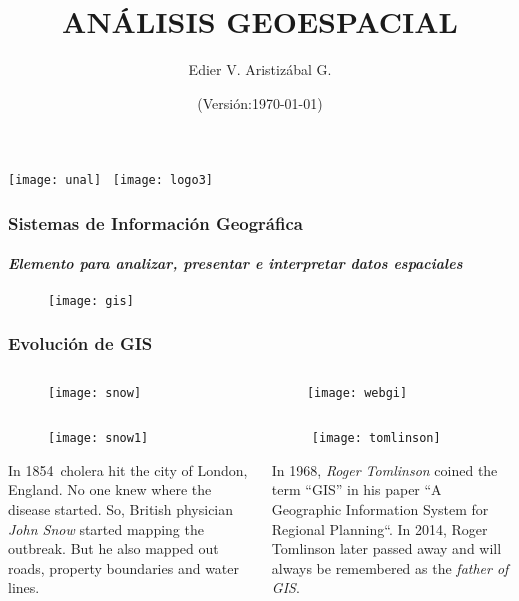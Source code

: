 \documentclass[14pt]{beamer}
\title[GIS - Intro]{ANÁLISIS GEOESPACIAL}
\author[Edier Aristizábal]{Edier V. Aristizábal G.}
\institute{\emph{evaristizabalg@unal.edu.co}}
\date{\tiny{(Versión:\today)}}
\begin{document}
\begin{frame}
\titlepage
\centering
	\texttt{[image: unal]}\hspace*{4.75cm}~%
   	\texttt{[image: logo3]}
\end{frame}
\begin{frame}
\frametitle{Sistemas de Información Geográfica}
\framesubtitle{\emph {Elemento para analizar, presentar e interpretar datos espaciales}}
  \begin{figure}
    \centering
    \texttt{[image: gis]}
  \end{figure}
\end{frame}
\begin{frame}\frametitle{Evolución de GIS}
\begin{columns}
		\begin{column}{.48\linewidth}
			\begin{figure}
				\texttt{[image: snow]}\\
			\end{figure}
		\end{column}
		\begin{column}{.48\linewidth}
			\begin{figure}
				\texttt{[image: webgi]}\\
			\end{figure}
		\end{column}
	\end{columns}
	\begin{columns}
		\begin{column}{.48\linewidth}
			\begin{figure}
				\texttt{[image: snow1]}\\
			\end{figure}
\scriptsize{In 1854\, cholera hit the city of London, England. No one knew where the disease started. So, British physician \emph{John Snow} started mapping the outbreak. But he also mapped out roads, property boundaries and water lines.}
		\end{column}
		\begin{column}{.48\linewidth}
			\begin{figure}
				\texttt{[image: tomlinson]}\\
			\end{figure}
\scriptsize{In 1968, \emph{Roger Tomlinson} coined the term “GIS” in his paper “A Geographic Information System for Regional Planning“. In 2014, Roger Tomlinson later passed away and will always be remembered as the \emph{father of GIS}.}
		\end{column}
	\end{columns}
\end{frame}
\end{document}
